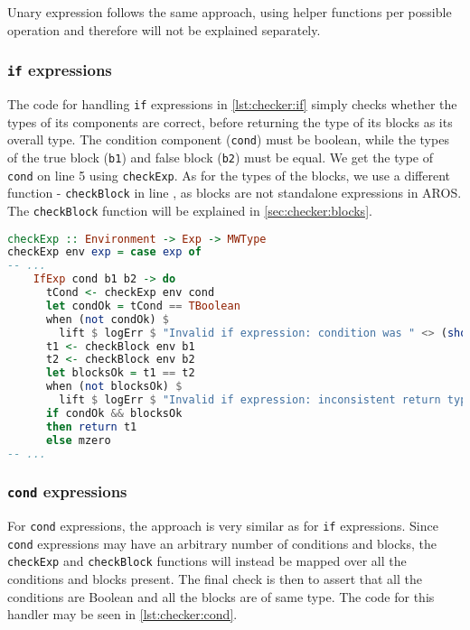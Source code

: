 \par Unary expression follows the same approach, using helper functions per possible operation and therefore will not be explained separately.

\subsubsection{\lstinline[language=none]{if} expressions}
The code for handling \lstinline[language=none]{if} expressions in \cref{lst:checker:if} simply checks whether the types of its components are correct, before returning the type of its blocks as its overall type. The condition component (\lstinline[language=none]{cond}) must be boolean, while the types of the true block (\lstinline{b1}) and false block (\lstinline{b2}) must be equal. We get the type of \lstinline[language=none]{cond} on line 5 using \lstinline{checkExp}. As for the types of the blocks, we use a different function - \lstinline{checkBlock} in line , as blocks are not standalone expressions in AROS. The \lstinline{checkBlock} function will be explained in \cref{sec:checker:blocks}.

\begin{lstlisting}[language=haskell,
caption={Handler for \lstinline{if} expressions},
label=lst:checker:if]
checkExp :: Environment -> Exp -> MWType
checkExp env exp = case exp of
-- ...
    IfExp cond b1 b2 -> do
      tCond <- checkExp env cond
      let condOk = tCond == TBoolean
      when (not condOk) $
        lift $ logErr $ "Invalid if expression: condition was " <> (show tCond)
      t1 <- checkBlock env b1
      t2 <- checkBlock env b2
      let blocksOk = t1 == t2
      when (not blocksOk) $
        lift $ logErr $ "Invalid if expression: inconsistent return types " <> (show t1) <> " and " <> (show t2)
      if condOk && blocksOk
      then return t1
      else mzero
-- ...
\end{lstlisting}

\subsubsection{\lstinline[language=none]{cond} expressions}
For \lstinline[language=none]{cond} expressions, the approach is very similar as for \lstinline[language=none]{if} expressions. Since \lstinline[language=none]{cond} expressions may have an arbitrary number of conditions and blocks, the \lstinline{checkExp} and \lstinline{checkBlock} functions will instead be mapped over all the conditions and blocks present. The final check is then to assert that all the conditions are Boolean and all the blocks are of same type. The code for this handler may be seen in \cref{lst:checker:cond}.

